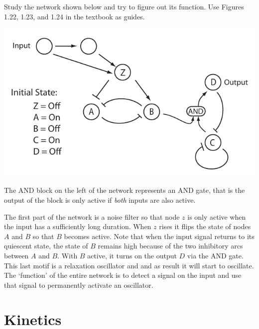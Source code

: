 \documentclass[12pt]{article}
\begin{document}
\begin{question}
Study the network shown below and try to figure out its function. Use Figures 1.22, 1.23, and 1.24 in the textbook as guides.

\begin{center}
  \includegraphics[scale = 0.8]{ComplicatedMotif}
\end{center}

The AND block on the left of the network represents an AND gate, that is the output of the block is only active if {\em both} inputs are also active.
\end{question}
\begin{solution}
The first part of the network is a noise filter so that node $z$ is only active when the input has a sufficiently long duration. When $z$ rises it flips the state of nodes $A$ and $B$ so that $B$ becomes active. Note that when the input signal returns to its quiescent state, the state of $B$ remains high because of the two inhibitory arcs between $A$ and $B$. With $B$ active, it turns on the output $D$ via the AND gate. This last motif is a relaxation oscillator and and as result it will start to oscillate. The `function' of the entire network is to detect a signal on the input and use that signal to permanently activate an oscillator.
\end{solution}



\section{Kinetics}
\end{document}

